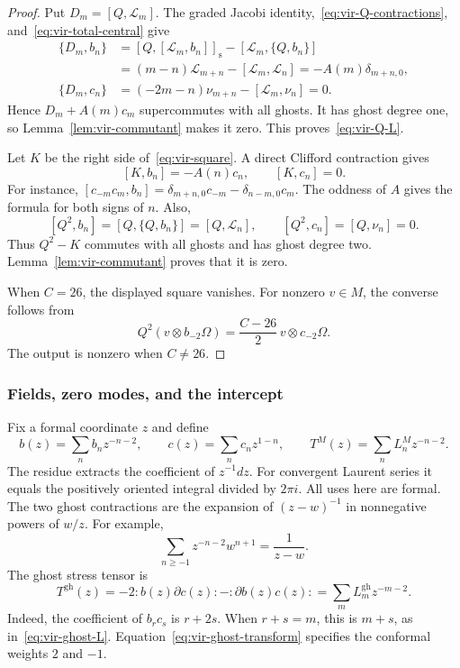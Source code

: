 \begin{proof}
Put $D_m=[Q,\mathcal L_m]$.
The graded Jacobi identity,~\eqref{eq:vir-Q-contractions}, and~\eqref{eq:vir-total-central} give
\begin{align*}
 \{D_m,b_n\}
 &=[Q,[\mathcal L_m,b_n]]_{\mathrm s}
   -[\mathcal L_m,\{Q,b_n\}]\\
 &=(m-n)\mathcal L_{m+n}-[\mathcal L_m,\mathcal L_n]
 =-A(m)\delta_{m+n,0},\\
 \{D_m,c_n\}
 &=(-2m-n)\nu_{m+n}-[\mathcal L_m,\nu_n]=0.
\end{align*}
Hence $D_m+A(m)c_m$ supercommutes with all ghosts.
It has ghost degree one, so Lemma~\ref{lem:vir-commutant} makes it zero.
This proves~\eqref{eq:vir-Q-L}.

Let $K$ be the right side of~\eqref{eq:vir-square}.
A direct Clifford contraction gives
\[
 [K,b_n]=-A(n)c_n,\qquad [K,c_n]=0.
\]
For instance,
$[c_{-m}c_m,b_n]=\delta_{m+n,0}c_{-m}-\delta_{n-m,0}c_m$.
The oddness of $A$ gives the formula for both signs of $n$.
Also,
\[
 [Q^2,b_n]=[Q,\{Q,b_n\}]=[Q,\mathcal L_n],\qquad
 [Q^2,c_n]=[Q,\nu_n]=0.
\]
Thus $Q^2-K$ commutes with all ghosts and has ghost degree two.
Lemma~\ref{lem:vir-commutant} proves that it is zero.

When $C=26$, the displayed square vanishes.
For nonzero $v\in M$, the converse follows from
\[
 Q^2(v\otimes b_{-2}\Omega)
 =\frac{C-26}{2}\,v\otimes c_{-2}\Omega.
\]
The output is nonzero when $C\neq26$.
\end{proof}

\subsubsection{Fields, zero modes, and the intercept}

Fix a formal coordinate $z$ and define
\[
 b(z)=\sum_n b_nz^{-n-2},\qquad
 c(z)=\sum_n c_nz^{1-n},\qquad
 T^M(z)=\sum_nL_n^Mz^{-n-2}.
\]
The residue extracts the coefficient of $z^{-1}dz$.
For convergent Laurent series it equals the positively oriented integral divided by $2\pi i$.
All uses here are formal.
The two ghost contractions are the expansion of $(z-w)^{-1}$ in nonnegative powers of $w/z$.
For example,
\[
 \sum_{n\geq-1}z^{-n-2}w^{n+1}=\frac1{z-w}.
\]
The ghost stress tensor is
\begin{equation}\label{eq:vir-stress-field}
 T^{\mathrm{gh}}(z)=-2:b(z)\partial c(z):-:\partial b(z)c(z):
 =\sum_mL_m^{\mathrm{gh}}z^{-m-2}.
\end{equation}
Indeed, the coefficient of $b_rc_s$ is $r+2s$.
When $r+s=m$, this is $m+s$, as in~\eqref{eq:vir-ghost-L}.
Equation~\eqref{eq:vir-ghost-transform} specifies the conformal weights $2$ and $-1$.

